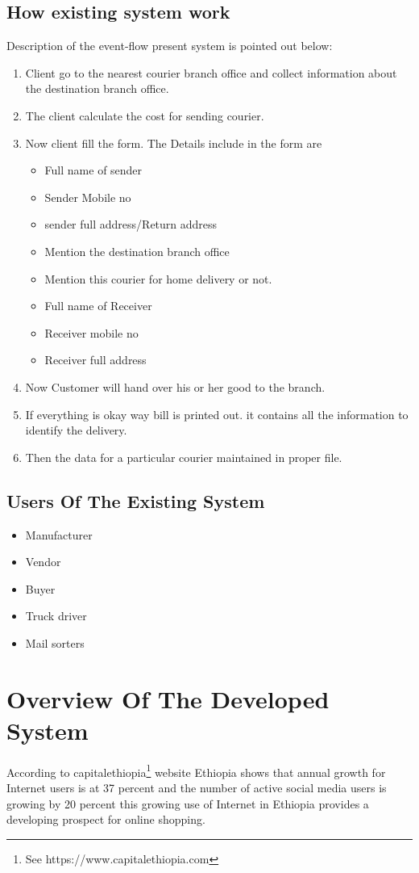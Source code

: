 \subsection{How existing system work}
Description of the event-flow present system is pointed out below:
\begin{enumerate}
	\item Client go to the nearest courier branch office and collect information about the destination branch office.
	\item The client calculate the cost for sending courier.
	\item Now client fill the form. The Details include in the form are
	\begin{itemize}
		\item Full name of sender
		\item Sender Mobile no 
		\item sender full address/Return address
		\item Mention the destination branch office 
		\item Mention this courier for home delivery or not.
		\item Full name of Receiver
		\item Receiver mobile no
		\item Receiver full address
	\end{itemize}
	\item Now Customer will hand over his or her good to the branch.
	\item If everything is okay way bill is printed out. it contains all the information to identify the delivery.
	\item  Then the data for a particular courier maintained in proper file.
\end{enumerate}

\subsection{Users Of The Existing System} 
\begin{itemize}
	\item Manufacturer
	\item Vendor
	\item Buyer
	\item Truck driver
	\item Mail sorters
\end{itemize}


\section{Overview Of The Developed System}
According to capitalethiopia\footnote{See https://www.capitalethiopia.com} website Ethiopia shows that annual growth for Internet users is at 37 percent and the number of active social media users is growing by 20 percent 
this growing use of Internet in Ethiopia provides a developing prospect for online shopping.

